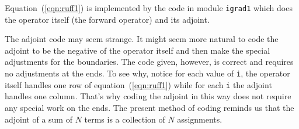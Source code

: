 Equation~(\ref{eqn:ruff1}) is implemented by the code
in module \texttt{igrad1}
which does the operator itself (the forward operator)
and its adjoint.

\par \noindent
The adjoint code may seem strange.
It might seem more natural to code the adjoint
to be the negative of the operator itself
and then make the special adjustments for the boundaries.
The code given, however, is correct and requires no adjustments
at the ends.
To see why, notice for each value of \texttt{i},
the operator itself handles one row of
equation~(\ref{eqn:ruff1})
while for each \texttt{i}
the adjoint handles one column.
That's why coding the adjoint in this way
does not require any special work on the ends.
The present method of coding reminds us that
the adjoint of a sum of $N$ terms is a collection of $N$ assignments.


\begin{comment}
\par
The Ratfor90 dialect of Fortran
allows us to write the inner code of
the \texttt{igrad1} module more simply and symmetrically
using the syntax of C, C++, and Java
where
expressions like {\tt a=a+b} can be written more tersely as {\tt a+=b}.
With this, the heart of module \texttt{igrad1} becomes
\begin{verbatim}
if( adj) {   xx(i+1) += yy(i)
             xx(i)   -= yy(i)
           }
else {       yy(i)   += xx(i+1)
             yy(i)   -= xx(i)
           }
\end{verbatim}
where we see that each component of the matrix is handled both
by the operator and the adjoint.
Think about the forward operator
``pulling'' a sum into {\tt yy(i)}, and
think about the adjoint operator
``pushing'' or ``spraying'' the impulse {\tt yy(i)} back into {\tt xx()}.
\end{comment}


